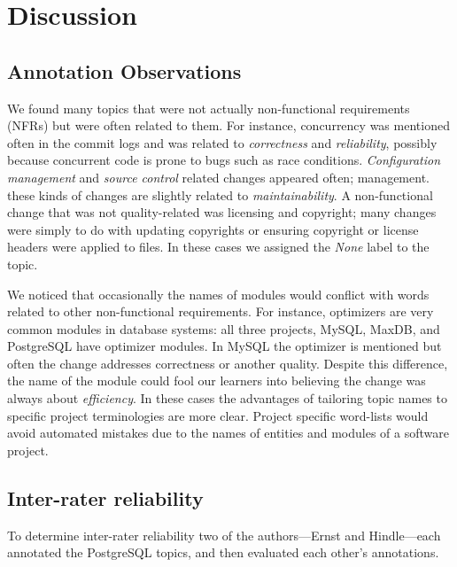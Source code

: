 \documentclass[smallextended]{svjour3}       %
\begin{document}
\section{Discussion}
\label{sec:limit}

\subsection{Annotation Observations}
We found many topics that were not actually non-functional requirements (NFRs) but were often related to them. 
For instance, concurrency was mentioned often in the commit logs and
was related to \emph{correctness} and \emph{reliability}, possibly because concurrent code is prone to bugs such as race conditions. %
\emph{Configuration management} and \emph{source control} related changes appeared often; %
management. 
these kinds of changes are slightly related to \emph{maintainability}. 
A non-functional change that was not quality-related was licensing and
copyright; many changes were simply to do with updating copyrights or
ensuring copyright or license headers were applied to files. In these
cases we assigned the \emph{None} label to the topic.

We noticed that occasionally the names of modules would conflict with words related to other non-functional requirements. 
For instance, optimizers are very common modules in database systems:
all three projects, MySQL, MaxDB, and PostgreSQL have optimizer modules. 
In MySQL the optimizer is mentioned but often the change addresses  correctness or another quality. 
Despite this difference, the name of the module could fool our learners into believing the change was always about \emph{efficiency}. 
In these cases the advantages of tailoring topic names to specific project terminologies are more clear. 
Project specific word-lists would avoid automated mistakes due to the names of entities and modules of a software project.

\subsection{Inter-rater reliability}

To determine inter-rater reliability two of the authors---Ernst and Hindle---each annotated the PostgreSQL topics,
and then evaluated each other's annotations.

\end{document}
